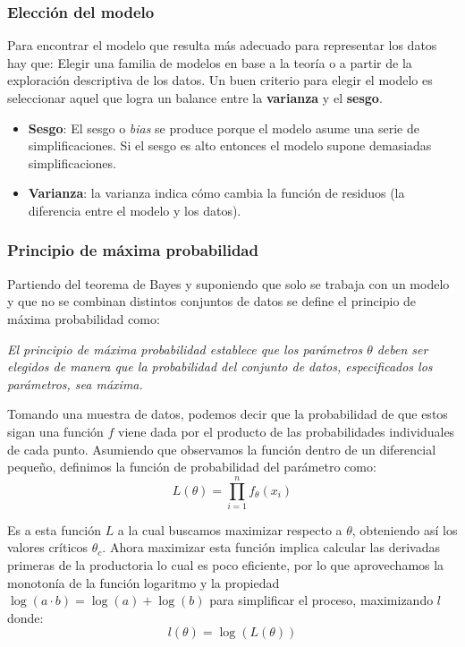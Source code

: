 \documentclass[twocolumn]{article}
\begin{document}
\subsubsection{Elección del modelo}

Para encontrar el modelo que resulta más adecuado para representar los datos hay que: Elegir una familia de modelos en base a la teoría o a partir de la exploración descriptiva de los datos. Un buen criterio para elegir el modelo es seleccionar aquel que logra un balance entre la \textbf{varianza} y el \textbf{sesgo}.

\begin{itemize}
\item \textbf{Sesgo}: El sesgo o \textit{bias} se produce porque el modelo asume una serie de simplificaciones. Si el sesgo es alto entonces el modelo supone demasiadas simplificaciones.
\item \textbf{Varianza}: la varianza indica cómo cambia la función de residuos (la diferencia entre el modelo y los datos).
\end{itemize}

\subsubsection{Principio de máxima probabilidad}

Partiendo del teorema de Bayes y suponiendo que solo se trabaja con un modelo y que no se combinan distintos conjuntos de datos se define el principio de máxima probabilidad como:

\textit{El principio de máxima probabilidad establece que los parámetros $\theta$ deben ser elegidos de manera que la probabilidad del conjunto de datos, especificados los parámetros, sea máxima.}

\medskip

Tomando una muestra de datos, podemos decir que la probabilidad de que estos sigan una función $f$ viene dada por el producto de las probabilidades individuales de cada punto. Asumiendo que observamos la función dentro de un diferencial pequeño, definimos la función de probabilidad del parámetro como:
\[
L\left( \theta  \right) = \prod_{i=1}^{n} f_{\theta}(x_i)
\]

Es a esta función $L$ a la cual buscamos maximizar respecto a $\theta$, obteniendo así los valores críticos $\theta_c$. Ahora maximizar esta función implica calcular las derivadas primeras de la productoria lo cual es poco eficiente, por lo que aprovechamos la monotonía de la función logaritmo y la propiedad $\log(a \cdot b) = \log(a) + \log(b)$ para simplificar el proceso, maximizando $l$ donde:
\[
l\left( \theta  \right) = \log(L(\theta))
\]
\end{document}
